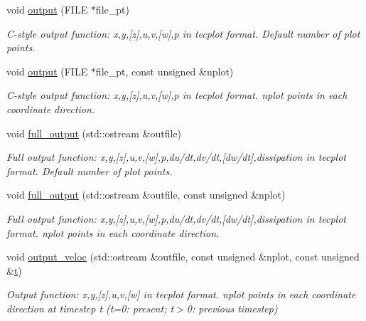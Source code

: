 \begin{DoxyCompactItemize}
void \hyperlink{classoomph_1_1SphericalNavierStokesEquations_a76ad2e32bc8d2efa6242e78ea66076ed}{output} (F\+I\+LE $\ast$file\+\_\+pt)
\begin{DoxyCompactList}\small\item\em C-\/style output function\+: x,y,\mbox{[}z\mbox{]},u,v,\mbox{[}w\mbox{]},p in tecplot format. Default number of plot points. \end{DoxyCompactList}\item 
void \hyperlink{classoomph_1_1SphericalNavierStokesEquations_afd0fd2912515b6c23142046c5c200640}{output} (F\+I\+LE $\ast$file\+\_\+pt, const unsigned \&nplot)
\begin{DoxyCompactList}\small\item\em C-\/style output function\+: x,y,\mbox{[}z\mbox{]},u,v,\mbox{[}w\mbox{]},p in tecplot format. nplot points in each coordinate direction. \end{DoxyCompactList}\item 
void \hyperlink{classoomph_1_1SphericalNavierStokesEquations_a2dfa5e66ae9d2e0b2464e18cd9b55beb}{full\+\_\+output} (std\+::ostream \&outfile)
\begin{DoxyCompactList}\small\item\em Full output function\+: x,y,\mbox{[}z\mbox{]},u,v,\mbox{[}w\mbox{]},p,du/dt,dv/dt,\mbox{[}dw/dt\mbox{]},dissipation in tecplot format. Default number of plot points. \end{DoxyCompactList}\item 
void \hyperlink{classoomph_1_1SphericalNavierStokesEquations_a444d7347a79629db8e59c1267b97f201}{full\+\_\+output} (std\+::ostream \&outfile, const unsigned \&nplot)
\begin{DoxyCompactList}\small\item\em Full output function\+: x,y,\mbox{[}z\mbox{]},u,v,\mbox{[}w\mbox{]},p,du/dt,dv/dt,\mbox{[}dw/dt\mbox{]},dissipation in tecplot format. nplot points in each coordinate direction. \end{DoxyCompactList}\item 
void \hyperlink{classoomph_1_1SphericalNavierStokesEquations_ae9b06a27652654ad42dc9882399e9374}{output\+\_\+veloc} (std\+::ostream \&outfile, const unsigned \&nplot, const unsigned \&\hyperlink{cfortran_8h_af6f0bd3dc13317f895c91323c25c2b8f}{t})
\begin{DoxyCompactList}\small\item\em Output function\+: x,y,\mbox{[}z\mbox{]},u,v,\mbox{[}w\mbox{]} in tecplot format. nplot points in each coordinate direction at timestep t (t=0\+: present; t$>$0\+: previous timestep) \end{DoxyCompactList}\item 

\end{DoxyCompactItemize}
